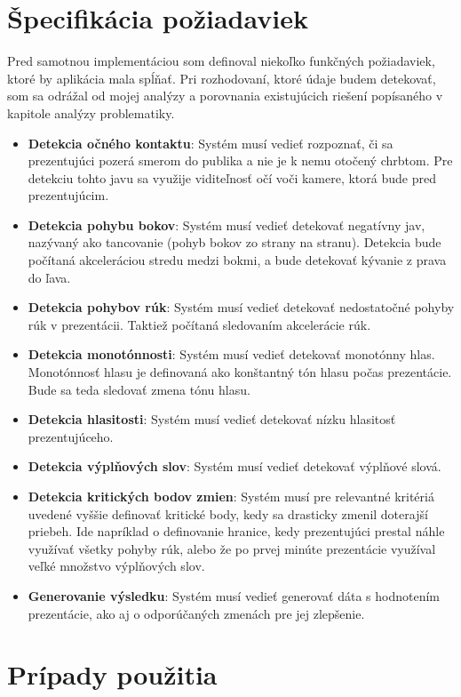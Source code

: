 \section{Špecifikácia požiadaviek}
Pred samotnou implementáciou som definoval niekoľko funkčných požiadaviek, ktoré by aplikácia mala spĺňať. Pri rozhodovaní, ktoré údaje budem detekovať, som sa odrážal od mojej analýzy a porovnania existujúcich riešení popísaného v kapitole analýzy problematiky.
\begin{itemize}
    \item \textbf{Detekcia očného kontaktu}: Systém musí vedieť rozpoznať, či sa prezentujúci pozerá smerom do publika a nie je k nemu otočený chrbtom. Pre detekciu tohto javu sa využije viditeľnosť očí voči kamere, ktorá bude pred prezentujúcim.
    \item \textbf{Detekcia pohybu bokov}: Systém musí vedieť detekovať negatívny jav, nazývaný ako tancovanie (pohyb bokov zo strany na stranu). Detekcia bude počítaná akceleráciou stredu medzi bokmi, a bude detekovať kývanie z prava do ľava.
    \item \textbf{Detekcia pohybov rúk}: Systém musí vedieť detekovať nedostatočné pohyby rúk v prezentácii. Taktiež počítaná sledovaním akcelerácie rúk.
    \item \textbf{Detekcia monotónnosti}: Systém musí vedieť detekovať monotónny hlas. Monotónnosť hlasu je definovaná ako konštantný tón hlasu počas prezentácie. Bude sa teda sledovať zmena tónu hlasu.
    \item \textbf{Detekcia hlasitosti}: Systém musí vedieť detekovať nízku hlasitosť prezentujúceho.
    \item \textbf{Detekcia výplňových slov}: Systém musí vedieť detekovať výplňové slová.
    \item \textbf{Detekcia kritických bodov zmien}: Systém musí pre relevantné kritériá uvedené vyššie definovať kritické body, kedy sa drasticky zmenil doterajší priebeh. Ide napríklad o definovanie hranice, kedy prezentujúci prestal náhle využívať všetky pohyby rúk, alebo že po prvej minúte prezentácie využíval veľké množstvo výplňových slov.
    \item \textbf{Generovanie výsledku}: Systém musí vedieť generovať dáta s hodnotením prezentácie, ako aj o odporúčaných zmenách pre jej zlepšenie.
\end{itemize}

\section{Prípady použitia}

